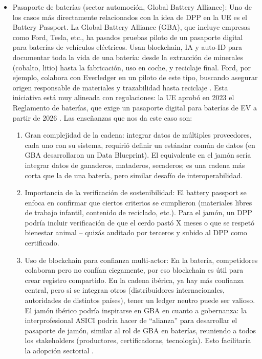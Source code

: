 \begin{itemize}
    \item Pasaporte de baterías (sector automoción, Global Battery Alliance): Uno de los casos más directamente relacionados con la idea de DPP en la UE es el Battery Passport. La Global Battery Alliance (GBA), que incluye empresas como Ford, Tesla, etc., ha pasados pruebas piloto de un pasaporte digital para baterías de vehículos eléctricos. Usan blockchain, IA y auto-ID para documentar toda la vida de una batería: desde la extracción de minerales (cobalto, litio) hasta la fabricación, uso en coche, y reciclaje final. Ford, por ejemplo, colabora con Everledger en un piloto de este tipo, buscando asegurar origen responsable de materiales y trazabilidad hasta reciclaje \cite{noauthor_10_nodate}. Esta iniciativa está muy alineada con regulaciones: la UE aprobó en 2023 el Reglamento de baterías, que exige un pasaporte digital para baterías de EV a partir de 2026 \cite{noauthor_boees_nodate-3}. Las enseñanzas que nos da este caso son:
    \begin{enumerate}
	\item Gran complejidad de la cadena: integrar datos de múltiples proveedores, cada uno con su sistema, requirió definir un estándar común de datos (en GBA desarrollaron un Data Blueprint). El equivalente en el jamón sería integrar datos de ganaderos, mataderos, secaderos; es una cadena más corta que la de una batería, pero similar desafío de interoperabilidad.
    \item Importancia de la verificación de sostenibilidad: El battery passport se enfoca en confirmar que ciertos criterios se cumplieron (materiales libres de trabajo infantil, contenido de reciclado, etc.). Para el jamón, un DPP podría incluir verificación de que el cerdo pastó X meses o que se respetó bienestar animal – quizás auditado por terceros y subido al DPP como certificado.
    \item Uso de blockchain para confianza multi-actor: En la batería, competidores colaboran pero no confían ciegamente, por eso blockchain es útil para crear registro compartido. En la cadena ibérica, ya hay más confianza central, pero si se integran otros (distribuidores internacionales, autoridades de distintos países), tener un ledger neutro puede ser valioso. El jamón ibérico podría inspirarse en GBA en cuanto a gobernanza: la interprofesional ASICI podría hacer de “alianza” para desarrollar el pasaporte de jamón, similar al rol de GBA en baterías, reuniendo a todos los stakeholders (productores, certificadoras, tecnología). Esto facilitaría la adopción sectorial \cite{noauthor_10_nodate}.

\end{enumerate}
\end{itemize}
